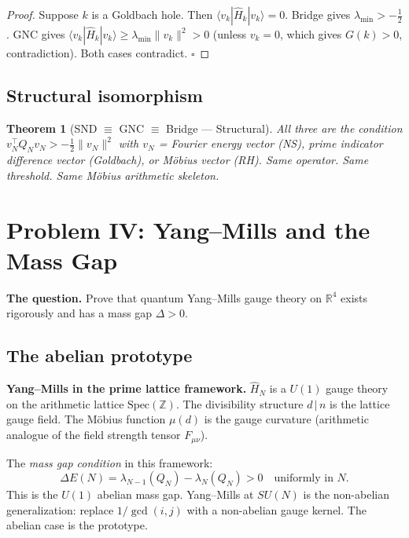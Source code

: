 \documentclass[12pt]{article}
\newtheorem{theorem}{Theorem}[section]
\newcommand{\ket}[1]{|{#1}\rangle}
\newcommand{\bra}[1]{\langle{#1}|}
\newcommand{\half}{\tfrac{1}{2}}
\begin{document}
\begin{proof}
Suppose $k$ is a Goldbach hole.
Then $\bra{v_k}\hat{H}_k\ket{v_k}=0$.
Bridge gives $\lambda_{\min}>-\half$.
GNC gives $\bra{v_k}\hat{H}_k\ket{v_k}\ge\lambda_{\min}\|v_k\|^2>0$
(unless $v_k=0$, which gives $G(k)>0$, contradiction).
Both cases contradict. \qquad$\square$
\end{proof}

\subsection{Structural isomorphism}

\begin{tcolorbox}[provedbox]
\begin{theorem}[SND $\equiv$ GNC $\equiv$ Bridge --- Structural]
All three are the condition
$v_N^\top Q_N v_N > -\half\|v_N\|^2$
with $v_N$ = Fourier energy vector (NS),
prime indicator difference vector (Goldbach),
or M\"{o}bius vector (RH).
Same operator. Same threshold. Same M\"{o}bius arithmetic skeleton.
\end{theorem}
\end{tcolorbox}

\section{Problem IV: Yang--Mills and the Mass Gap}
\label{sec:ym}

\textbf{The question.}
Prove that quantum Yang--Mills gauge theory on $\mathbb{R}^4$ exists
rigorously and has a mass gap $\Delta > 0$.

\subsection{The abelian prototype}

\begin{tcolorbox}[qbox]
\textbf{Yang--Mills in the prime lattice framework.}
$\hat{H}_N$ is a $U(1)$ gauge theory on the arithmetic lattice
$\mathrm{Spec}(\mathbb{Z})$.
The divisibility structure $d\,|\,n$ is the lattice gauge field.
The M\"{o}bius function $\mu(d)$ is the gauge curvature
(arithmetic analogue of the field strength tensor $F_{\mu\nu}$).

The \emph{mass gap condition} in this framework:
\[
  \Delta E(N) = \lambda_{N-1}(Q_N) - \lambda_N(Q_N) > 0
  \quad\text{uniformly in }N.
\]
This is the $U(1)$ abelian mass gap.
Yang--Mills at $SU(N)$ is the non-abelian generalization:
replace $1/\gcd(i,j)$ with a non-abelian gauge kernel.
The abelian case is the prototype.
\end{tcolorbox}
\end{document}
